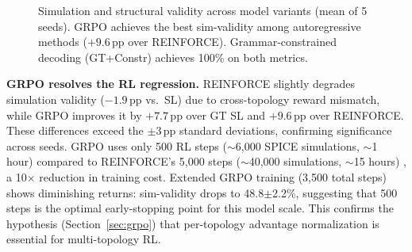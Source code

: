 \documentclass[conference]{IEEEtran}
\begin{document}
\begin{figure}[t]
\centering
{}
\caption{Simulation and structural validity across model variants
(mean of 5 seeds). GRPO achieves the best sim-validity
among autoregressive methods ($+9.6$\,pp over REINFORCE). Grammar-constrained
decoding (GT+Constr) achieves 100\% on both metrics.}
\label{fig:validity}
\end{figure}

\textbf{GRPO resolves the RL regression.} REINFORCE slightly degrades
simulation validity ($-1.9$\,pp vs.\ SL) due to cross-topology reward
mismatch, while GRPO improves it by $+7.7$\,pp over GT SL and
$+9.6$\,pp over REINFORCE. These differences exceed the $\pm$3\,pp
standard deviations, confirming significance across seeds.
GRPO uses only 500 RL steps
($\sim$6,000 SPICE simulations, $\sim$1 hour) compared to
REINFORCE's 5,000 steps ($\sim$40,000 simulations, $\sim$15 hours)
, a 10$\times$ reduction in training cost. Extended GRPO training
(3,500 total steps) shows diminishing returns: sim-validity drops
to 48.8$\pm$2.2\%, suggesting that 500 steps is the optimal
early-stopping point for this model scale.
This confirms the hypothesis
(Section~\ref{sec:grpo}) that per-topology advantage normalization
is essential for multi-topology RL.
\end{document}
